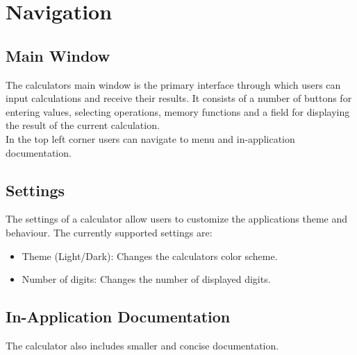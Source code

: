 \section{Navigation}

\subsection{Main Window}

The calculators main window is the primary interface through which users can input calculations and receive their results. It consists of a number of buttons for entering values, selecting operations, memory functions and a field for displaying the result of the current calculation.
\\
In the top left corner users can navigate to menu and in-application documentation.
\subsection{Settings}

The settings of a calculator allow users to customize the applications theme and behaviour.
The currently supported settings are:

 \begin{itemize}
 	\item Theme (Light/Dark): Changes the calculators color scheme.
 	\item Number of digits: Changes the number of displayed digits.
 \end{itemize}
\subsection{In-Application Documentation}

The calculator also includes smaller and concise documentation. 